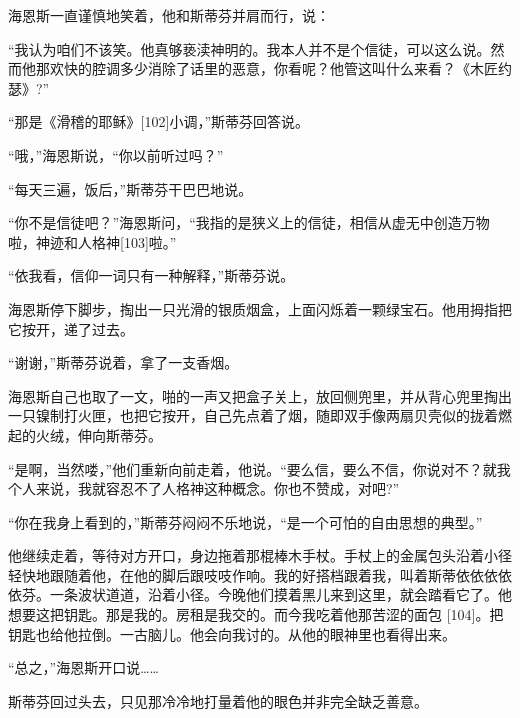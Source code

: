 \documentclass{article}
\begin{document}
海恩斯一直谨慎地笑着，他和斯蒂芬并肩而行，说：



“我认为咱们不该笑。他真够亵渎神明的。我本人并不是个信徒，可以这么说。然而他那欢快的腔调多少消除了话里的恶意，你看呢？他管这叫什么来看？《木匠约瑟》?”



“那是《滑稽的耶稣》[102]小调，”斯蒂芬回答说。



“哦，”海恩斯说，“你以前听过吗？”



“每天三遍，饭后，”斯蒂芬干巴巴地说。



“你不是信徒吧？”海恩斯问，“我指的是狭义上的信徒，相信从虚无中创造万物啦，神迹和人格神[103]啦。”



“依我看，信仰一词只有一种解释，”斯蒂芬说。



海恩斯停下脚步，掏出一只光滑的银质烟盒，上面闪烁着一颗绿宝石。他用拇指把它按开，递了过去。



“谢谢，”斯蒂芬说着，拿了一支香烟。



海恩斯自己也取了一文，啪的一声又把盒子关上，放回侧兜里，并从背心兜里掏出一只镍制打火匣，也把它按开，自己先点着了烟，随即双手像两扇贝壳似的拢着燃起的火绒，伸向斯蒂芬。



“是啊，当然喽，”他们重新向前走着，他说。“要么信，要么不信，你说对不？就我个人来说，我就容忍不了人格神这种概念。你也不赞成，对吧?”



“你在我身上看到的，”斯蒂芬闷闷不乐地说，“是一个可怕的自由思想的典型。”



他继续走着，等待对方开口，身边拖着那棍棒木手杖。手杖上的金属包头沿着小径轻快地跟随着他，在他的脚后跟吱吱作响。我的好搭档跟着我，叫着斯蒂依依依依依芬。一条波状道道，沿着小径。今晚他们摸着黑儿来到这里，就会踏看它了。他想要这把钥匙。那是我的。房租是我交的。而今我吃着他那苦涩的面包 [104]。把钥匙也给他拉倒。一古脑儿。他会向我讨的。从他的眼神里也看得出来。



“总之，”海恩斯开口说……



斯蒂芬回过头去，只见那冷冷地打量着他的眼色并非完全缺乏善意。
\end{document}
